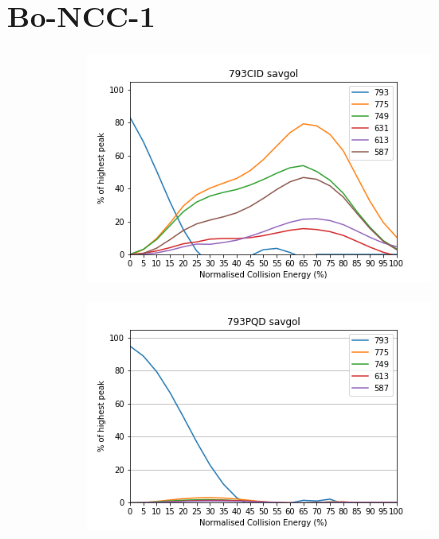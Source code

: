 \pagebreak
\section{Bo-NCC-1}

\begin{figure}[!htbp]
  \begin{subfigure}[b]{0.5\textwidth}
    \includegraphics[width=\textwidth]{content/Anhang/ESIMS/Bo-NCC-1/793CID-793savgol.png}
    \caption{}
  \end{subfigure}
  \hfill
  \begin{subfigure}[b]{0.5\textwidth}
    \includegraphics[width=\textwidth]{content/Anhang/ESIMS/Bo-NCC-1/793PQD-793savgol.png}
    \caption{}
  \end{subfigure}
  

\end{figure}
